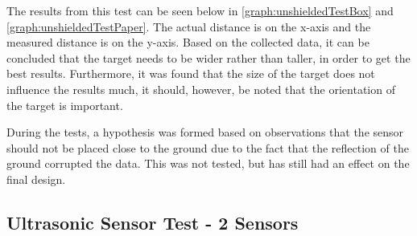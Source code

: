 
The results from this test can be seen below in
\autoref{graph:unshieldedTestBox} and \autoref{graph:unshieldedTestPaper}. The
actual distance is on the x-axis and the measured distance is on the y-axis.
Based on the collected data, it can be concluded that the target needs to be
wider rather than taller, in order to get the best results. Furthermore, it was
found that the size of the target does not influence the results much, it
should, however, be noted that the orientation of the target is important.





% 

During the tests, a hypothesis was formed based on observations that the sensor
should not be placed close to the ground due to the fact that the reflection of
the ground corrupted the data. This was not tested, but has still had an effect
on the final design. 

\subsection{Ultrasonic Sensor Test - 2 Sensors}

